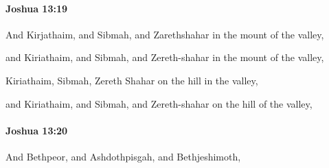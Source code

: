 		\paragraph{Joshua 13:19} %
			\label{JOSHUA-13-19}

			And Kirjathaim, and Sibmah, and Zarethshahar in the mount of the valley,

			\begin{versebox}
					\item[BHS] 
					\item[ASV] and Kiriathaim, and Sibmah, and Zereth-shahar in the mount of the valley,
					\item[NIV] Kiriathaim, Sibmah, Zereth Shahar on the hill in the valley,
					\item[NRSV] and Kiriathaim, and Sibmah, and Zereth-shahar on the hill of the valley,
			\end{versebox}

		\paragraph{Joshua 13:20} %
			\label{JOSHUA-13-20}

			And Bethpeor, and Ashdothpisgah, and Bethjeshimoth,

